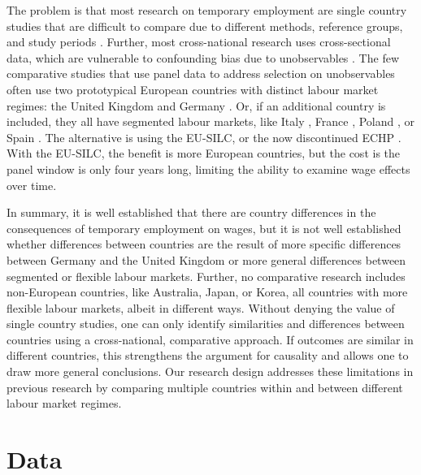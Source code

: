 \documentclass[12pt]{article}
\begin{document}
The problem is that most research on temporary employment are single country studies that are difficult to compare due to different methods, reference groups, and study periods \citep{filomena_picchio_2022}.  Further, most cross-national research uses cross-sectional data, which are vulnerable to confounding bias due to unobservables \citep{arranz_wage_2021,westhoff_wage_2022,fauser_gebel_2023}.  The few comparative studies that use panel data to address selection on unobservables often use two prototypical European countries with distinct labour market regimes: the United Kingdom and Germany \citep{gebel_early_2010,giesecke_external_2004,pavlopoulos_starting_2013}.  Or, if an additional country is included, they all have segmented labour markets, like Italy \citep{scherer_stepping-stones_2004}, France \citep{gash_fixed-term_2007}, Poland \citep{kiersztyn_fixed-term_2016}, or Spain \citep{mertens_cost_2007}.  The alternative is using the EU-SILC, or the now discontinued ECHP \citep{debels_transitions_2008,kahn_structure_2016}.  With the EU-SILC, the benefit is more European countries, but the cost is the panel window is only four years long, limiting the ability to examine wage effects over time.  

In summary, it is well established that there are country differences in the consequences of temporary employment on wages, but it is not well established whether differences between countries are the result of more specific differences between Germany and the United Kingdom or more general differences between segmented or flexible labour markets.  Further, no comparative research includes non-European countries, like Australia, Japan, or  Korea, all countries with more flexible labour markets, albeit in different ways.  Without denying the value of single country studies, one can only identify similarities and differences between countries using a cross-national, comparative approach.  If outcomes are similar in different countries, this strengthens the argument for causality and allows one to draw more general conclusions.  Our research design addresses these limitations in previous research by comparing multiple countries within and between different labour market regimes.

\section{Data}
\end{document}
